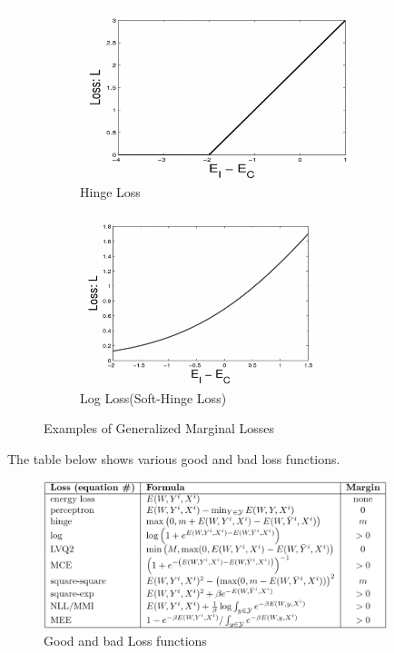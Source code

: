 \begin{figure}[h]
 
\begin{subfigure}{0.5\textwidth}
\includegraphics[width=0.9\linewidth, height=5cm]{lectures/08-b/Hinge.png} 
\caption{Hinge Loss}
\label{fig:subim1}
\end{subfigure}
\begin{subfigure}{0.5\textwidth}
\includegraphics[width=0.9\linewidth, height=5cm]{lectures/08-b/Log_Loss.png}
\caption{Log Loss(Soft-Hinge Loss)}
\label{fig:subim2}
\end{subfigure}
 
\caption{Examples of Generalized Marginal Losses}
\label{fig:image2}
\end{figure}

The table below shows various good and bad loss functions.
\begin{figure}[h]
\centering
\includegraphics[width=100mm]{lectures/08-b/Good_Bad_Loss.png}
\caption{Good and bad Loss functions}
\end{figure}
 